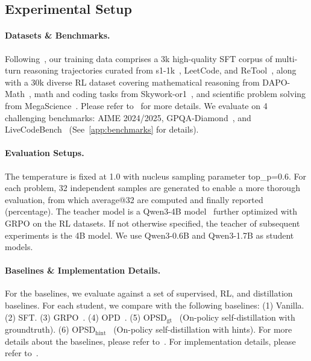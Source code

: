 \subsection{Experimental Setup}









\paragraph{Datasets \& Benchmarks.} Following~\citet{demy}, our training data comprises a 3k high-quality SFT corpus of multi-turn reasoning trajectories curated from s1-1k~\citep{muennighoff2025s1}, LeetCode, and ReTool~\citep{feng2025retool}, along with a 30k diverse RL dataset covering mathematical reasoning from DAPO-Math~\citep{yu2025dapo}, math and coding tasks from Skywork-or1~\citep{he2025skywork-or1}, and scientific problem solving from MegaScience~\citep{fan2025megascience}. Please refer to~ for more details. We evaluate on 4 challenging benchmarks: AIME 2024/2025, GPQA-Diamond~\citep{rein2024gpqa}, and LiveCodeBench~\citep{jainlivecodebench} (See~\cref{app:benchmarks} for details).





\paragraph{Evaluation Setups.}

The temperature is fixed at 1.0 with nucleus sampling parameter top\_p=0.6. For each problem, 32 independent samples are generated to enable a more thorough evaluation, from which average@32 are computed and finally reported (percentage). %
The teacher model is a Qwen3-4B model~\citep{qwen2025qwen3} further optimized with GRPO on the RL datasets.
If not otherwise specified, the teacher of subsequent experiments is the 4B model. %
We use Qwen3-0.6B and Qwen3-1.7B as student models.


\paragraph{Baselines \& Implementation Details.}
For the baselines,
we evaluate \ourmodel against a set of supervised, RL, and distillation baselines.
For each student, we compare \ourmodel with the following baselines:
(1) Vanilla.
(2) SFT.
(3) GRPO~\citep{grpo}.
(4) OPD~\citep{opd}.
(5) OPSD$_{\mathrm{gt}}$~\citep{opsd} (On-policy self-distillation with groundtruth).
(6) OPSD$_{\mathrm{hint}}$~\citep{opsd} (On-policy self-distillation with hints).
For more details about the baselines, please refer to~.
For implementation details, please refer to~.
